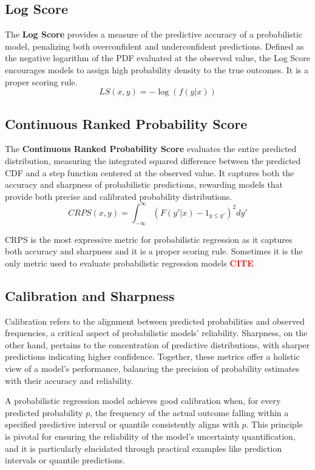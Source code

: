 \documentclass{article}
\newcommand{\citee}[1]{\textbf{\textcolor{red}{CITE}}}
\begin{document}
\subsection{Log Score}
The \textbf{Log Score} provides a measure of the predictive accuracy of a probabilistic model, penalizing both overconfident and underconfident predictions. Defined as the negative logarithm of the PDF evaluated at the observed value, the Log Score encourages models to assign high probability density to the true outcomes. It is a proper scoring rule.
\begin{equation}
    LS(x, y) = -\log(f(y|x))
\end{equation}

\subsection{Continuous Ranked Probability Score}
The \textbf{Continuous Ranked Probability Score} evaluates the entire predicted distribution, measuring the integrated squared difference between the predicted CDF and a step function centered at the observed value. It captures both the accuracy and sharpness of probabilistic predictions, rewarding models that provide both precise and calibrated probability distributions.
\begin{equation}
    CRPS(x, y) = \int_{-\infty}^{\infty} (F(y'|x) - \mathrm{1}_{y \leq y'})^2 dy'
\end{equation}

CRPS is the most expressive metric for probabilistic regression as it captures both accuracy and sharpness and it is a proper scoring rule. Sometimes it is the only metric used to evaluate probabilistic regression models \citee. 

\subsection{Calibration and Sharpness}
Calibration refers to the alignment between predicted probabilities and observed frequencies, a critical aspect of probabilistic models' reliability. Sharpness, on the other hand, pertains to the concentration of predictive distributions, with sharper predictions indicating higher confidence. Together, these metrics offer a holistic view of a model's performance, balancing the precision of probability estimates with their accuracy and reliability.

A probabilistic regression model achieves good calibration when, for every predicted probability $p$, the frequency of the actual outcome falling within a specified predictive interval or quantile consistently aligns with $p$. This principle is pivotal for ensuring the reliability of the model's uncertainty quantification, and it is particularly elucidated through practical examples like prediction intervals or quantile predictions.
\end{document}
